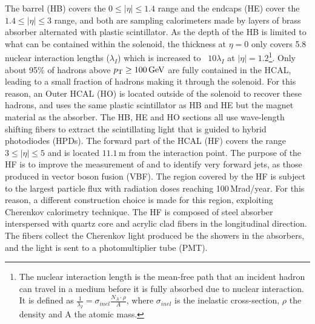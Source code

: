The barrel (HB) covers the $0\leq|\eta|\leq1.4$ range and the endcaps (HE) cover the $1.4\leq|\eta|\leq3$ range, and both are sampling calorimeters made by layers of brass absorber alternated with plastic scintillator. 
As the depth of the HB is limited to what can be contained within the solenoid, the thickness at $\eta=0$ only covers 5.8 nuclear interaction lengths ($\lambda_{I}$) which is increased to ~$10\lambda_{I}$ at $|\eta|=1.2$\footnote{The nuclear interaction length is the mean-free path that an incident hadron can travel in a medium before it is fully absorbed due to nuclear interaction. It is defined as $\frac{1}{\lambda_{I}}=\sigma_{inel}\frac{N_{A}\cdot\rho}{A}$, where $\sigma_{inel}$ is the inelastic cross-section, $\rho$ the density and A the atomic mass.}. 
Only about 95\% of hadrons above $p_{\mathrm{T}}\geq100\,\text{Ge\hspace{-.08em}V}$ are fully contained in the HCAL, leading to a small fraction of hadrons making it through the solenoid. 
For this reason, an Outer HCAL (HO) is located outside of the solenoid to recover these hadrons, and uses the same plastic scintillator as HB and HE but the magnet material as the absorber. 
The HB, HE and HO sections all use wave-length shifting fibers to extract the scintillating light that is guided to hybrid photodiodes (HPDs).  
The forward part of the HCAL (HF) covers the range $3\leq|\eta|\leq5$ and is located $11.1\,$m from the interaction point. 
The purpose of the HF is to improve the measurement of \ptmiss and to identify very forward jets, as those produced in vector boson fusion (VBF). 
The region covered by the HF is subject to the largest particle flux with radiation doses reaching 100$\,$Mrad/year. 
For this reason, a different construction choice is made for this region, exploiting Cherenkov calorimetry technique. 
The HF is composed of steel absorber interspersed with quartz core and acrylic clad fibers in the longitudinal direction\cite{CERN-LHCC-97-031}.
The fibers collect the Cherenkov light produced be the showers in the absorbers, and the light is sent to a photomultiplier tube (PMT).    
